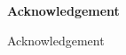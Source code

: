 \begin{center}
{\LARGE\bfseries
Acknowledgement}
\end{center}

\vspace{5mm}

{\small

Acknowledgement

}

\clearpage

